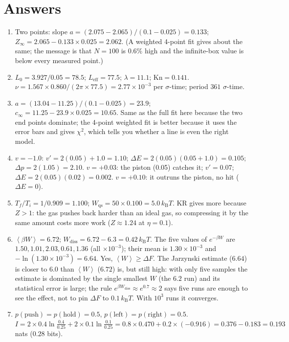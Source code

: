 \documentclass[11pt,a4paper]{article}
\newcommand{\kT}{k_{\mathrm B}T}
\newcommand{\avg}[1]{\left\langle #1 \right\rangle}
\begin{document}
\section{Answers}
\label{sec:answers}
\begin{enumerate}[label=\textbf{\arabic*.},nosep,itemsep=3pt]
\item Two points: slope $a = (2.075-2.065)/(0.1-0.025) = 0.133$; $Z_\infty = 2.065 - 0.133\times0.025 = 2.062$. (A weighted 4-point fit gives about the same; the message is that $N = 100$ is $0.6\%$ high and the infinite-box value is below every measured point.)
\item $L_0 = 3.927/0.05 = 78.5$; $L_{\mathrm{eff}} = 77.5$; $\lambda = 11.1$; $\mathrm{Kn} = 0.141$. $\nu = 1.567\times0.860/(2\pi\times77.5) = 2.77\times10^{-3}$ per $\sigma$-time; period $361$ $\sigma$-time.
\item $a = (13.04-11.25)/(0.1-0.025) = 23.9$; $c_\infty = 11.25 - 23.9\times0.025 = 10.65$. Same as the full fit here because the two end points dominate; the 4-point weighted fit is better because it uses the error bars and gives $\chi^2$, which tells you whether a line is even the right model.
\item $v = -1.0$: $v' = 2(0.05)+1.0 = 1.10$; $\Delta E = 2(0.05)(0.05+1.0) = 0.105$; $\Delta p = 2(1.05) = 2.10$. $v = +0.03$: the piston (0.05) catches it; $v' = 0.07$; $\Delta E = 2(0.05)(0.02) = 0.002$. $v = +0.10$: it outruns the piston, no hit ($\Delta E = 0$).
\item $T_f/T_i = 1/0.909 = 1.100$; $W_{\mathrm{qs}} = 50\times0.100 = 5.0\,\kT$. KR gives more because $Z>1$: the gas pushes back harder than an ideal gas, so compressing it by the same amount costs more work ($Z\approx1.24$ at $\eta = 0.1$).
\item $\avg{\beta W} = 6.72$; $W_{\mathrm{diss}} = 6.72-6.3 = 0.42\,\kT$. The five values of $e^{-\beta W}$ are $1.50, 1.01, 2.03, 0.61, 1.36$ (all $\times10^{-3}$); their mean is $1.30\times10^{-3}$ and $-\ln(1.30\times10^{-3}) = 6.64$. Yes, $\avg W\ge\Delta F$. The Jarzynski estimate ($6.64$) is closer to $6.0$ than $\avg W$ ($6.72$) is, but still high: with only five samples the estimate is dominated by the single smallest $W$ (the $6.2$ run) and its statistical error is large; the rule $e^{\beta W_{\mathrm{diss}}} \approx e^{0.7}\approx2$ says five runs are enough to see the effect, not to pin $\Delta F$ to $0.1\,\kT$. With $10^3$ runs it converges.
\item $p(\text{push}) = p(\text{hold}) = 0.5$, $p(\text{left}) = p(\text{right}) = 0.5$. $I = 2\times0.4\ln\frac{0.4}{0.25} + 2\times0.1\ln\frac{0.1}{0.25} = 0.8\times0.470 + 0.2\times(-0.916) = 0.376 - 0.183 = 0.193$ nats ($0.28$ bits).
\end{enumerate}
\end{document}
